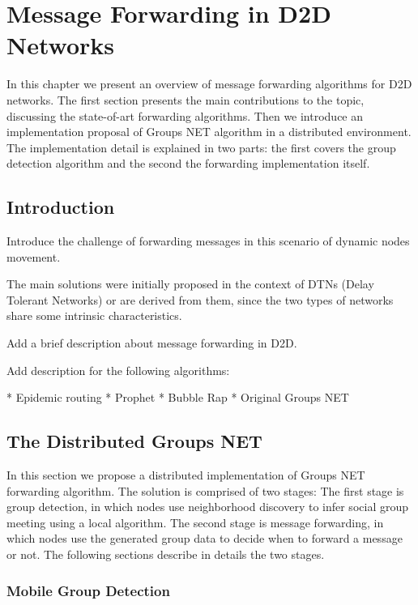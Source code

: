 \chapter{Message Forwarding in D2D Networks}

In this chapter we present an overview of message forwarding algorithms for D2D networks. The first section
presents the main contributions to the topic, discussing the state-of-art forwarding algorithms. Then we introduce
an implementation proposal of Groups NET algorithm \citealt{nunes2016groupsnet} in a distributed environment.
The implementation detail is explained in two parts: the first covers the group detection algorithm and the
second the forwarding implementation itself.

\section{Introduction}

Introduce the challenge of forwarding messages in this scenario of dynamic nodes movement.

The main solutions were initially proposed in the context of DTNs (Delay Tolerant Networks) or are derived from them,
since the two types of networks share some intrinsic characteristics.

Add a brief description about message forwarding in D2D.

Add description for the following algorithms:

* Epidemic routing
* Prophet
* Bubble Rap
* Original Groups NET

\section{The Distributed Groups NET}

In this section we propose a distributed implementation of Groups NET forwarding algorithm. The solution is
comprised of two stages: The first stage is group detection, in which nodes use neighborhood discovery to
infer social group meeting using a local algorithm. The second stage is message forwarding, in which nodes
use the generated group data to decide when to forward a message or not. The following sections describe in
details the two stages.

\subsection{Mobile Group Detection}

